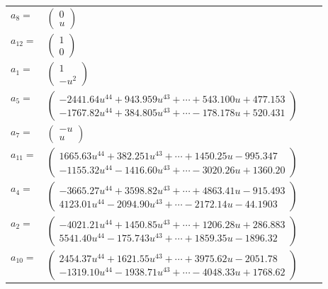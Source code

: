 \documentclass[1p]{elsarticle_modified}
\theoremstyle{definition}
\begin{document}
\begin{tabular}{m{7pt} m{180pt} m{7pt} m{180pt} }
\flushright $a_{8}=$&$\begin{pmatrix}0\\u\end{pmatrix}$ \\
\flushright $a_{12}=$&$\begin{pmatrix}1\\0\end{pmatrix}$ \\
\flushright $a_{1}=$&$\begin{pmatrix}1\\- u^2\end{pmatrix}$ \\
\flushright $a_{5}=$&$\begin{pmatrix}-2441.64 u^{44}+943.959 u^{43}+\cdots+543.100 u+477.153\\-1767.82 u^{44}+384.805 u^{43}+\cdots-178.178 u+520.431\end{pmatrix}$ \\
\flushright $a_{7}=$&$\begin{pmatrix}- u\\u\end{pmatrix}$ \\
\flushright $a_{11}=$&$\begin{pmatrix}1665.63 u^{44}+382.251 u^{43}+\cdots+1450.25 u-995.347\\-1155.32 u^{44}-1416.60 u^{43}+\cdots-3020.26 u+1360.20\end{pmatrix}$ \\
\flushright $a_{4}=$&$\begin{pmatrix}-3665.27 u^{44}+3598.82 u^{43}+\cdots+4863.41 u-915.493\\4123.01 u^{44}-2094.90 u^{43}+\cdots-2172.14 u-44.1903\end{pmatrix}$ \\
\flushright $a_{2}=$&$\begin{pmatrix}-4021.21 u^{44}+1450.85 u^{43}+\cdots+1206.28 u+286.883\\5541.40 u^{44}-175.743 u^{43}+\cdots+1859.35 u-1896.32\end{pmatrix}$ \\
\flushright $a_{10}=$&$\begin{pmatrix}2454.37 u^{44}+1621.55 u^{43}+\cdots+3975.62 u-2051.78\\-1319.10 u^{44}-1938.71 u^{43}+\cdots-4048.33 u+1768.62\end{pmatrix}$ \\

\end{tabular}
\end{document}
